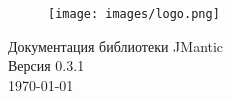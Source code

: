 \begin{titlepage}

\begin{figure}
    \centering
    \texttt{[image: images/logo.png]}
\end{figure}

\begin{center}
    \huge Документация библиотеки JMantic \\[0.5em]
    \large Версия 0.3.1 \\[0.5em]
    
    \vfill
    \today
\end{center}

\end{titlepage}